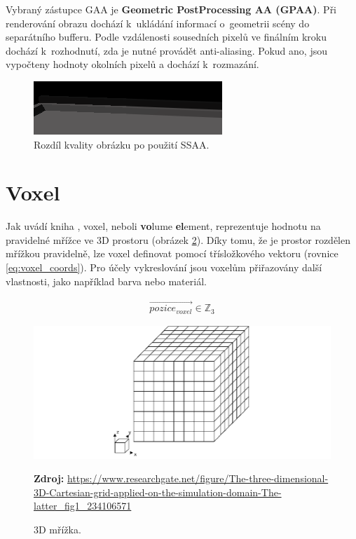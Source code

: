 Vybraný zástupce GAA je \textbf{Geometric PostProcessing AA (GPAA)}. Při renderování obrazu dochází k~ukládání informací o~geometrii scény do separátního bufferu. Podle vzdálenosti sousedních pixelů ve finálním kroku dochází k~rozhodnutí, zda je nutné provádět anti-aliasing. Pokud ano, jsou vypočteny hodnoty okolních pixelů a dochází k~rozmazání.

\begin{figure}[H]
	\centering
	\includegraphics[scale=3]{obrazky-figures/ssaa_diff.png}
	\caption{Rozdíl kvality obrázku po použití SSAA.}
	\label{fig:aliasing}
\end{figure}




\section{Voxel} \label{voxels}
Jak uvádí kniha \cite{gfx_principles_practice}, voxel, neboli \textbf{vo}lume \textbf{el}ement, reprezentuje hodnotu na pravidelné mřížce ve 3D prostoru (obrázek \ref{fig:3d_grid}). Díky tomu, že je prostor rozdělen mřížkou pravidelně, lze voxel definovat pomocí třísložkového vektoru (rovnice \ref{eq:voxel_coords}). Pro účely vykreslování jsou voxelům přiřazovány další vlastnosti, jako například barva nebo materiál.

\begin{equation} \label{eq:voxel_coords}
	\begin{gathered}
		\vec{pozice_{voxel}} \in \mathbb{Z}_3
	\end{gathered}
\end{equation}

\begin{figure}[H]
	\centering
	\includegraphics[scale=0.5]{obrazky-figures/3d_grid.png}
	\caption{3D mřížka.}
	\textbf{Zdroj: }\url{https://www.researchgate.net/figure/The-three-dimensional-3D-Cartesian-grid-applied-on-the-simulation-domain-The-latter_fig1_234106571}
	\label{fig:3d_grid}
\end{figure}

